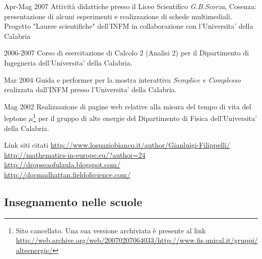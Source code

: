 \begin{CV}
	\item[Apr-Mag 2007] Attività didattiche presso il Liceo Scientifico {\em G.B.Scorza}, Cosenza: presentazione di alcuni esperimenti e realizzazione di schede multimediali. Progetto "Lauree scientifiche" dell'INFM in collaborazione con l'Universita' della Calabria
	
	\item[2006-2007] Corso di esercitazione di Calcolo 2 (Analisi 2) per il Dipartimento di Ingegneria dell'Universita' della Calabria.
	
	\item[Mar 2004] Guida e performer per la mostra interattiva {\em Semplice e Complesso} realizzata dall'INFM presso l'Universita' della Calabria.
	
	\item[Mag 2002] Realizzazione di pagine web relative alla misura del tempo di vita del leptone $\mu$\footnote{Sito cancellato. Una sua versione archiviata è presente al link \href{http://web.archive.org/web/20070207064033/http://www.fis.unical.it/gruppi/alteenergie/}{http://web.archive.org/web/20070207064033/http://www.fis.unical.it/gruppi/alteenergie/}} per il gruppo di alte energie del Dipartimento di Fisica dell'Universita' della Calabria.
	
	\item[Link siti citati] \href{http://www.lospaziobianco.it/author/Gianluigi-Filippelli/}{http://www.lospaziobianco.it/author/Gianluigi-Filippelli/}\\
	\href{http://mathematics-in-europe.eu/?author=24}{http://mathematics-in-europe.eu/?author=24}\\
	\href{http://dropseaofulaula.blogspot.com/}{http://dropseaofulaula.blogspot.com/}\\
	\href{http://docmadhattan.fieldofscience.com/}{http://docmadhattan.fieldofscience.com/}
	
\end{CV}

\subsection*{Insegnamento nelle scuole}

